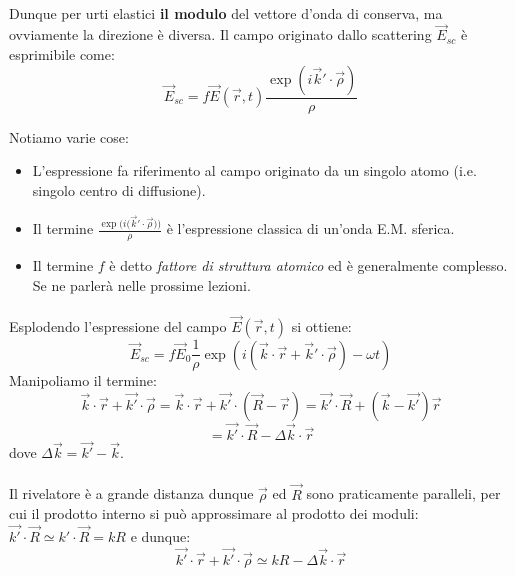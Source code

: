 \documentclass{book}
\begin{document}
                \paragraph{}
                    Dunque per urti elastici \textbf{il modulo} del vettore d'onda di conserva, ma ovviamente la direzione è diversa. Il campo originato dallo scattering $\vec{E}_{sc}$ è esprimibile come:
                    $$\vec{E}_{sc} = f\vec{E}(\vec{r},t)\frac{\exp({i \vec{k}' \cdot \vec{\rho}})}{\rho}$$

                    Notiamo varie cose: 
                    \begin{itemize}
                        \item  L'espressione fa riferimento al campo originato da un singolo atomo (i.e. singolo centro di diffusione).
                        \item Il termine $\displaystyle \frac{\exp{(i (\vec{k}' \cdot \vec{\rho}}))}{\rho}$ è l'espressione classica di un'onda E.M. sferica.
                        \item Il termine $f$ è detto \textit{fattore di struttura atomico} ed è generalmente complesso. Se ne parlerà nelle prossime lezioni.
                    \end{itemize} 

                \paragraph{}Esplodendo l'espressione del campo $\vec{E}(\vec{r},t)$ si ottiene:
                $$\vec{E}_{sc} = f \vec{E}_{0} \frac{1}{\rho} \exp{(i(\vec{k} \cdot \vec{r} + \vec{k}' \cdot \vec{\rho}) - \omega t)}$$
                Manipoliamo il termine:
                $$\vec{k} \cdot \vec{r} + \vec{k'} \cdot \vec{\rho} = \vec{k} \cdot \vec{r} + \vec{k'} \cdot (\vec{R}-\vec{r}) = \vec{k'} \cdot \vec{R} + (\vec{k}-\vec{k'})\vec{r}$$
                $$ = \vec{k'} \cdot \vec{R}-\Delta \vec{k} \cdot \vec{r}$$
                dove $\Delta \vec{k} = \vec{k'}-\vec{k}$.

                \paragraph{}
                    Il rivelatore è a grande distanza dunque $\vec{\rho}$ ed $\vec{R}$ sono praticamente paralleli, per cui il prodotto interno si può approssimare al prodotto dei moduli:
                    $\vec{k'} \cdot \vec{R} \simeq k' \cdot \vec{R} = k R$
                    e dunque:
                    $$\vec{k'} \cdot \vec{r}+ \vec{k'} \cdot \vec{\rho} \simeq kR - \Delta \vec{k} \cdot \vec{r}$$
\end{document}
